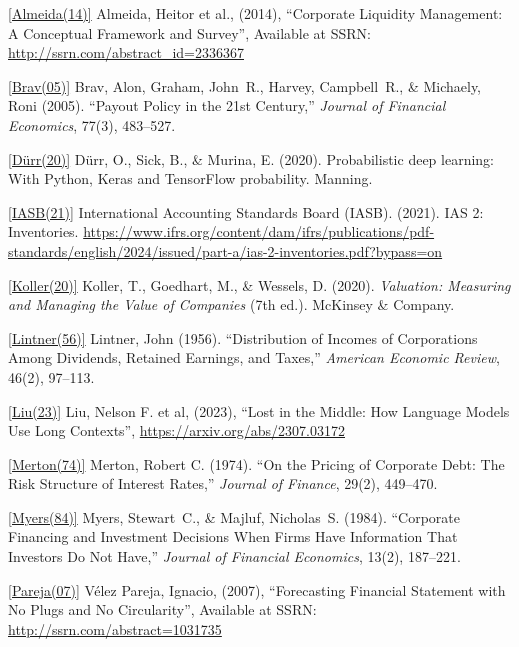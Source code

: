 \documentclass[12pt,a4paper]{article}
\begin{document}
\hypertarget{ref:almeida14}{}\hyperlink{ref:almeida14}{[Almeida(14)]} Almeida, Heitor et al., (2014), ``Corporate Liquidity
Management: A Conceptual Framework and Survey'', Available at SSRN:
\url{http://ssrn.com/abstract_id=2336367}

\hypertarget{ref:brav05}{}\hyperlink{ref:brav05}{[Brav(05)]} Brav, Alon, Graham, John~R., Harvey, Campbell~R., \&
Michaely, Roni (2005). ``Payout Policy in the 21st Century,''
\emph{Journal of Financial Economics}, 77(3), 483--527.

\hypertarget{ref:durr20}{}\hyperlink{ref:durr20}{[Dürr(20)]} Dürr, O., Sick, B., \& Murina, E. (2020). Probabilistic
deep learning: With Python, Keras and TensorFlow probability. Manning.

\hypertarget{ref:iasb21}{}\hyperlink{ref:iasb21}{[IASB(21)]} International Accounting Standards Board (IASB). (2021).
IAS 2: Inventories.
\url{https://www.ifrs.org/content/dam/ifrs/publications/pdf-standards/english/2024/issued/part-a/ias-2-inventories.pdf?bypass=on}

\hypertarget{ref:koller20}{}\hyperlink{ref:koller20}{[Koller(20)]} Koller, T., Goedhart, M., \& Wessels, D. (2020).
\emph{Valuation: Measuring and Managing the Value of Companies} (7th ed.). McKinsey \& Company.

\hypertarget{ref:lintner56}{}\hyperlink{ref:lintner56}{[Lintner(56)]} Lintner, John (1956). ``Distribution of Incomes of
Corporations Among Dividends, Retained Earnings, and Taxes,''
\emph{American Economic Review}, 46(2), 97--113.

\hypertarget{ref:liu23}{}\hyperlink{ref:liu23}{[Liu(23)]} Liu, Nelson F. et al, (2023), ``Lost in the Middle: How
Language Models Use Long Contexts'',
\url{https://arxiv.org/abs/2307.03172}

\hypertarget{ref:merton74}{}\hyperlink{ref:merton74}{[Merton(74)]} Merton, Robert C. (1974). ``On the Pricing of
Corporate Debt: The Risk Structure of Interest Rates,''
\emph{Journal of Finance}, 29(2), 449--470.

\hypertarget{ref:myers84}{}\hyperlink{ref:myers84}{[Myers(84)]} Myers, Stewart~C., \& Majluf, Nicholas~S. (1984).
``Corporate Financing and Investment Decisions When Firms Have
Information That Investors Do Not Have,'' \emph{Journal of Financial
Economics}, 13(2), 187--221.

\hypertarget{ref:pareja07}{}\hyperlink{ref:pareja07}{[Pareja(07)]} Vélez Pareja, Ignacio, (2007), ``Forecasting Financial
Statement with No Plugs and No Circularity'', Available at SSRN:
\url{http://ssrn.com/abstract=1031735}
\end{document}
